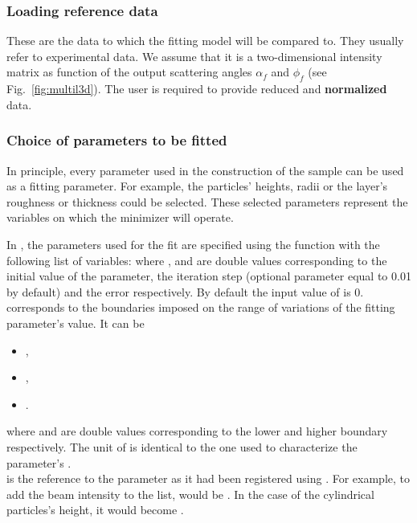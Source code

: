 \subsubsection{Loading reference data}
These are the data to which the fitting model will
be compared to. They usually refer to experimental data. We assume that it is a
two-dimensional intensity matrix as function of the output scattering
angles $\alpha_f$ and $\phi_f$ (see Fig.~\ref{fig:multil3d}). The user
is required to provide reduced and \textbf{normalized} data. 

\subsubsection{Choice of parameters to be fitted}
In principle, every parameter used in the construction of the sample
can be used as a fitting parameter. For example, the particles'
heights, radii or the layer's roughness or thickness could be selected. These selected parameters
  represent the variables on which the minimizer will operate.


In \BornAgain, the parameters used for the fit are specified using the
function  with the following list
of variables:  where ,  and  are double
values corresponding to the initial value of the parameter, the
iteration step (optional parameter equal to 0.01 by default) and the error respectively. By default the input value
of  is 0.  corresponds to
the boundaries imposed on the range of variations of the fitting
parameter's value. It can be
\begin{itemize}
\item {}, 
\item {}, 
\item {}.
\end{itemize}
where  and  are
double values corresponding to the lower and higher boundary respectively.
The unit of  is identical to the one used to characterize the
parameter's .\\

\noindent {} is the reference to the parameter as it had been registered
using . For example, to add the beam
intensity to the list,  would be
. In the case of the cylindrical particles's
 height, it would become .\\

